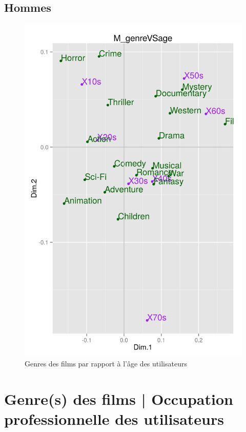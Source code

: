 \documentclass[11pt]{article}
\begin{document}
\pagebreak
\subsection{Hommes}
\begin{figure}[htd]
\centering
\includegraphics[scale=0.65]{./images/M_genreVSage}
\caption{Genres des films par rapport à l'âge des utilisateurs}
\end{figure}

\pagebreak
\section{Genre(s) des films | Occupation professionnelle des utilisateurs}
\end{document}
